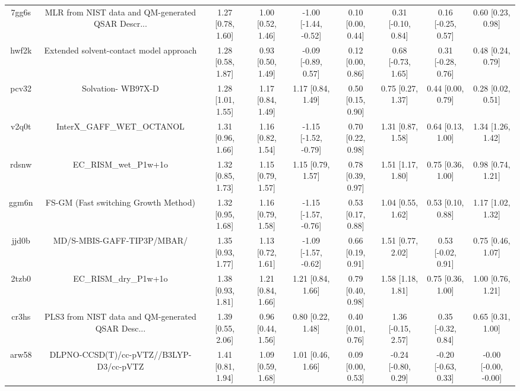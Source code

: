 \documentclass{article}
\begin{document}
\begin{center}
\begin{longtable}{|ccccccccc|}
 7gg6s &  MLR from NIST data and QM-generated QSAR Descr... &  1.27 [0.78, 1.60] &  1.00 [0.52, 1.46] &  -1.00 [-1.44, -0.52] &  0.10 [0.00, 0.44] &   0.31 [-0.10, 0.84] &   0.16 [-0.25, 0.57] &     0.60 [0.23, 0.98] \\
 hwf2k &            Extended solvent-contact model approach &  1.28 [0.58, 1.87] &  0.93 [0.50, 1.49] &   -0.09 [-0.89, 0.57] &  0.12 [0.00, 0.86] &   0.68 [-0.73, 1.65] &   0.31 [-0.28, 0.76] &     0.48 [0.24, 0.79] \\
 pcv32 &                                 Solvation- WB97X-D &  1.28 [1.01, 1.55] &  1.17 [0.84, 1.49] &     1.17 [0.84, 1.49] &  0.50 [0.15, 0.90] &    0.75 [0.27, 1.37] &    0.44 [0.00, 0.79] &     0.28 [0.02, 0.51] \\
 v2q0t &                         InterX\_GAFF\_WET\_OCTANOL &  1.31 [0.96, 1.66] &  1.16 [0.82, 1.54] &  -1.15 [-1.52, -0.79] &  0.70 [0.22, 0.98] &    1.31 [0.87, 1.58] &    0.64 [0.13, 1.00] &     1.34 [1.26, 1.42] \\
 rdsnw &                              EC\_RISM\_wet\_P1w+1o &  1.32 [0.85, 1.73] &  1.15 [0.79, 1.57] &     1.15 [0.79, 1.57] &  0.78 [0.39, 0.97] &    1.51 [1.17, 1.80] &    0.75 [0.36, 1.00] &     0.98 [0.74, 1.21] \\
 ggm6n &               FS-GM (Fast switching Growth Method) &  1.32 [0.95, 1.68] &  1.16 [0.79, 1.58] &  -1.15 [-1.57, -0.76] &  0.53 [0.17, 0.88] &    1.04 [0.55, 1.62] &    0.53 [0.10, 0.88] &     1.17 [1.02, 1.32] \\
 jjd0b &                         MD/S-MBIS-GAFF-TIP3P/MBAR/ &  1.35 [0.93, 1.77] &  1.13 [0.72, 1.61] &  -1.09 [-1.57, -0.62] &  0.66 [0.19, 0.91] &    1.51 [0.77, 2.02] &   0.53 [-0.02, 0.91] &     0.75 [0.46, 1.07] \\
 2tzb0 &                              EC\_RISM\_dry\_P1w+1o &  1.38 [0.93, 1.81] &  1.21 [0.84, 1.66] &     1.21 [0.84, 1.66] &  0.79 [0.40, 0.98] &    1.58 [1.18, 1.81] &    0.75 [0.36, 1.00] &     1.00 [0.76, 1.21] \\
 cr3hs &  PLS3 from NIST data and QM-generated QSAR Desc... &  1.39 [0.55, 2.06] &  0.96 [0.44, 1.56] &     0.80 [0.22, 1.48] &  0.40 [0.01, 0.76] &   1.36 [-0.15, 2.57] &   0.35 [-0.32, 0.84] &     0.65 [0.31, 1.00] \\
 arw58 &            DLPNO-CCSD(T)/cc-pVTZ//B3LYP-D3/cc-pVTZ &  1.41 [0.81, 1.94] &  1.09 [0.59, 1.68] &     1.01 [0.46, 1.66] &  0.09 [0.00, 0.53] &  -0.24 [-0.80, 0.29] &  -0.20 [-0.63, 0.33] &  -0.00 [-0.00, -0.00] \\

\end{longtable}
\end{center}
\end{document}
